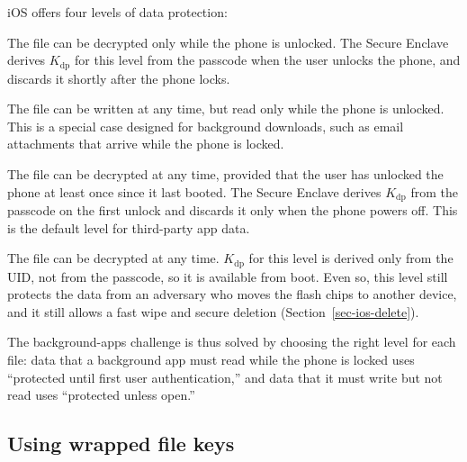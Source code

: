 \documentclass[
  letterpaper,
]{scrbook}
\providecommand{\tightlist}{%
  \setlength{\itemsep}{0pt}\setlength{\parskip}{0pt}}
\theoremstyle{definition}
\theoremstyle{plain}
\theoremstyle{plain}
\theoremstyle{remark}
\begin{document}
iOS offers four levels of data protection:

\begin{description}
\tightlist
\item[\textbf{Complete protection.}]
The file can be decrypted only while the phone is unlocked. The Secure
Enclave derives \(K_\text{dp}\) for this level from the passcode when
the user unlocks the phone, and discards it shortly after the phone
locks.
\item[\textbf{Protected unless open.}]
The file can be written at any time, but read only while the phone is
unlocked. This is a special case designed for background downloads, such
as email attachments that arrive while the phone is locked.

\item[\textbf{Protected until first user authentication.}]
The file can be decrypted at any time, provided that the user has
unlocked the phone at least once since it last booted. The Secure
Enclave derives \(K_\text{dp}\) from the passcode on the first unlock
and discards it only when the phone powers off. This is the default
level for third-party app data.
\item[\textbf{No protection.}]
The file can be decrypted at any time. \(K_\text{dp}\) for this level is
derived only from the UID, not from the passcode, so it is available
from boot. Even so, this level still protects the data from an adversary
who moves the flash chips to another device, and it still allows a fast
wipe and secure deletion (Section~\ref{sec-ios-delete}).
\end{description}

The background-apps challenge is thus solved by choosing the right level
for each file: data that a background app must read while the phone is
locked uses ``protected until first user authentication,'' and data that
it must write but not read uses ``protected unless open.''

\subsection{Using wrapped file keys}\label{using-wrapped-file-keys}
\end{document}
